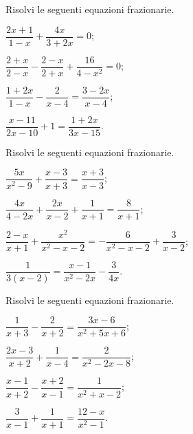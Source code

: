 \begin{esercizio}[\Ast]
\label{ese:18.11}
Risolvi le seguenti equazioni frazionarie.
\begin{multicols}{2}
\begin{enumeratea}
 \item $\dfrac{2x+1}{1-x}+\dfrac{4x}{3+2x}=0$;
 \item $\dfrac{2+x}{2-x}-\dfrac{2-x}{2+x}+\dfrac{16}{4-x^{2}}=0$;
 \item $\dfrac{1+2x}{1-x}-\dfrac{2}{x-4}=\dfrac{3-2x}{x-4}$;
 \item $\dfrac{x-11}{2x-10}+1=\dfrac{1+2x}{3x-15}$.
\end{enumeratea}
\end{multicols}
\end{esercizio}

\begin{esercizio}[\Ast]
\label{ese:18.12}
Risolvi le seguenti equazioni frazionarie.
\begin{multicols}{2}
\begin{enumeratea}
 \item $\dfrac{5x}{x^{2}-9}+\dfrac{x-3}{x+3}=\dfrac{x+3}{x-3}$;
 \item $\dfrac{4x}{4-2x}+\dfrac{2x}{x-2}+\dfrac{1}{x+1}=\dfrac{8}{x+1}$;
 \item $\dfrac{2-x}{x+1}+\dfrac{x^{2}}{x^{2}-x-2}=-\dfrac{6}{x^{2}-x-2}+\dfrac{3}{x-2}$;
 \item $\dfrac{1}{3(x-2)}=\dfrac{x-1}{x^{2}-2x}-\dfrac{3}{4x}$.
\end{enumeratea}
\end{multicols}
\end{esercizio}

\begin{esercizio}[\Ast]
\label{ese:18.13}
Risolvi le seguenti equazioni frazionarie.
\begin{multicols}{2}
\begin{enumeratea}
 \item $\dfrac{1}{x+3}-\dfrac{2}{x+2}=\dfrac{3x-6}{x^{2}+5x+6}$;
 \item $\dfrac{2x-3}{x+2}+\dfrac{1}{x-4}=\dfrac{2}{x^{2}-2x-8}$;
 \item $\dfrac{x-1}{x+2}-\dfrac{x+2}{x-1}=\dfrac{1}{x^{2}+x-2}$;
 \item $\dfrac{3}{x-1}+\dfrac{1}{x+1}=\dfrac{12-x}{x^{2}-1}$.
\end{enumeratea}
\end{multicols}
\end{esercizio}

